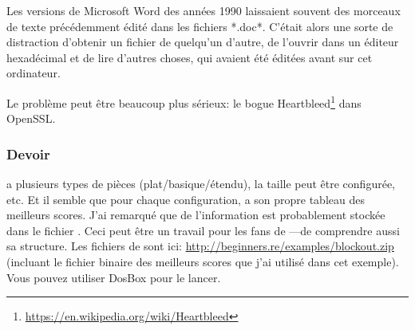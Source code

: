 Les versions de Microsoft Word des années 1990 laissaient souvent des morceaux de
texte précédemment édité dans les fichiers *.doc*.
C'était alors une sorte de distraction d'obtenir un fichier  de quelqu'un
d'autre, de l'ouvrir dans un éditeur hexadécimal et de lire d'autres choses, qui
avaient été éditées avant sur cet ordinateur.

Le problème peut être beaucoup plus sérieux: le bogue Heartbleed\footnote{\url{https://en.wikipedia.org/wiki/Heartbleed}}
dans OpenSSL.

\subsubsection{Devoir}

 a plusieurs types de pièces (plat/basique/étendu), la taille peut être configurée, etc.
Et il semble que pour chaque configuration,  a son propre tableau des
meilleurs scores.
J'ai remarqué que de l'information est probablement stockée dans le fichier .
Ceci peut être un travail pour les fans de ---de comprendre aussi sa
structure.
Les fichiers de  sont ici: \url{http://beginners.re/examples/blockout.zip}
(incluant le fichier binaire des meilleurs scores que j'ai utilisé dans cet exemple).
Vous pouvez utiliser DosBox pour le lancer.


